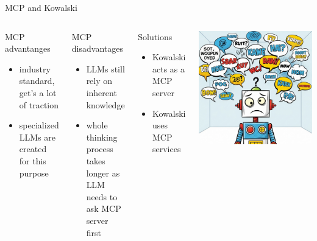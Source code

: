 \documentclass[aspectratio=169]{beamer}
\begin{document}
\begin{frame}{MCP and Kowalski}
\begin{columns}
\begin{block}{MCP advantanges}
\begin{itemize}
  \item industry standard, get's a lot of traction
  \item specialized LLMs are created for this purpose
\end{itemize}
\end{block}
\begin{block}{MCP disadvantages}
\begin{itemize}
  \item LLMs still rely on inherent knowledge
  \item whole thinking process takes longer as LLM needs to ask MCP server first
\end{itemize}
\end{block}
\begin{block}{Solutions}
  \begin{itemize}
    \item Kowalski acts as a MCP server
    \item Kowalski uses MCP services
  \end{itemize}
\end{block}
    \includegraphics[width=\linewidth]{robot_conf}
\end{columns}

\end{frame}
\end{document}
